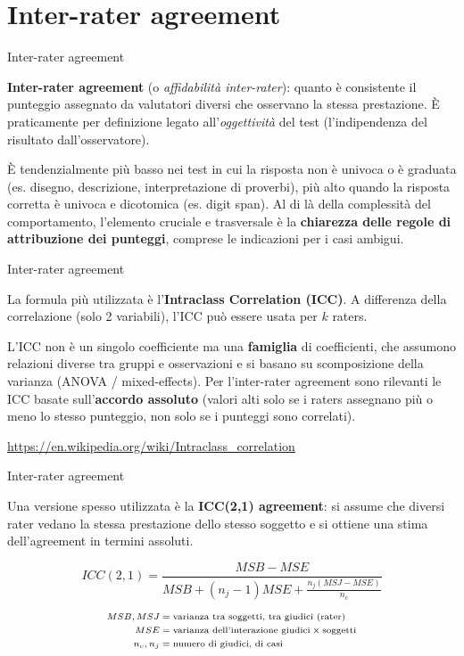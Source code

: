 \documentclass[
  ignorenonframetext,
  aspectratio=169,
]{beamer}
\begin{document}
\section{Inter-rater agreement}\label{inter-rater-agreement}

\begin{frame}{Inter-rater agreement}
\label{inter-rater-agreement-1}
\small

\textbf{Inter-rater agreement} (o \emph{affidabilità inter-rater}):
quanto è consistente il punteggio assegnato da valutatori diversi che
osservano la stessa prestazione. È praticamente per definizione legato
all'\emph{oggettività} del test (l'indipendenza del risultato
dall'osservatore).

È tendenzialmente più basso nei test in cui la risposta non è univoca o
è graduata (es. disegno, descrizione, interpretazione di proverbi), più
alto quando la risposta corretta è univoca e dicotomica (es. digit
span). Al di là della complessità del comportamento, l'elemento cruciale
e trasversale è la \textbf{chiarezza delle regole di attribuzione dei
punteggi}, comprese le indicazioni per i casi ambigui.
\end{frame}

\begin{frame}{Inter-rater agreement}
\label{inter-rater-agreement-2}
\small

La formula più utilizzata è l'\textbf{Intraclass Correlation (ICC)}. A
differenza della correlazione (solo 2 variabili), l'ICC può essere usata
per \(k\) raters.

L'ICC non è un singolo coefficiente ma una \textbf{famiglia} di
coefficienti, che assumono relazioni diverse tra gruppi e osservazioni e
si basano su scomposizione della varianza (ANOVA / mixed-effects). Per
l'inter-rater agreement sono rilevanti le ICC basate
sull'\textbf{accordo assoluto} (valori alti solo se i raters assegnano
più o meno lo stesso punteggio, non solo se i punteggi sono correlati).

\href{https://en.wikipedia.org/wiki/Intraclass_correlation}{\ul{https://en.wikipedia.org/wiki/Intraclass\_correlation}}
\end{frame}

\begin{frame}{Inter-rater agreement}
\label{inter-rater-agreement-3}
\small

Una versione spesso utilizzata è la \textbf{ICC(2,1) agreement}: si
assume che diversi rater vedano la stessa prestazione dello stesso
soggetto e si ottiene una stima dell'agreement in termini assoluti.

\[
ICC(2,1) = \frac{MSB - MSE}
{MSB + (n_j - 1)MSE + \frac{n_j(MSJ - MSE)}{n_c}}
\]

\[
\scriptsize
\begin{aligned}
MSB, MSJ & = \text{varianza tra soggetti, tra giudici (rater)} \\
MSE & = \text{varianza dell'interazione giudici} \times \text{soggetti} \\
n_c, n_j & = \text{numero di giudici, di casi}
\end{aligned}
\]
\end{frame}
\end{document}
